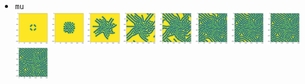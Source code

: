 \begin{itemize}
\item {\tt mu}\\
\includegraphics[height=1.4cm]{python_codes/fieldstone_171/pearson93_rand/mu_solution_0001000_u}
\includegraphics[height=1.4cm]{python_codes/fieldstone_171/pearson93_rand/mu_solution_0005000_u}
\includegraphics[height=1.4cm]{python_codes/fieldstone_171/pearson93_rand/mu_solution_0010000_u}
\includegraphics[height=1.4cm]{python_codes/fieldstone_171/pearson93_rand/mu_solution_0015000_u}
\includegraphics[height=1.4cm]{python_codes/fieldstone_171/pearson93_rand/mu_solution_0020000_u}
\includegraphics[height=1.4cm]{python_codes/fieldstone_171/pearson93_rand/mu_solution_0030000_u}
\includegraphics[height=1.4cm]{python_codes/fieldstone_171/pearson93_rand/mu_solution_0040000_u}
\includegraphics[height=1.4cm]{python_codes/fieldstone_171/pearson93_rand/mu_solution_0050000_u}
\includegraphics[height=1.4cm]{python_codes/fieldstone_171/pearson93_rand/mu_solution_final_u}\\

\end{itemize}
